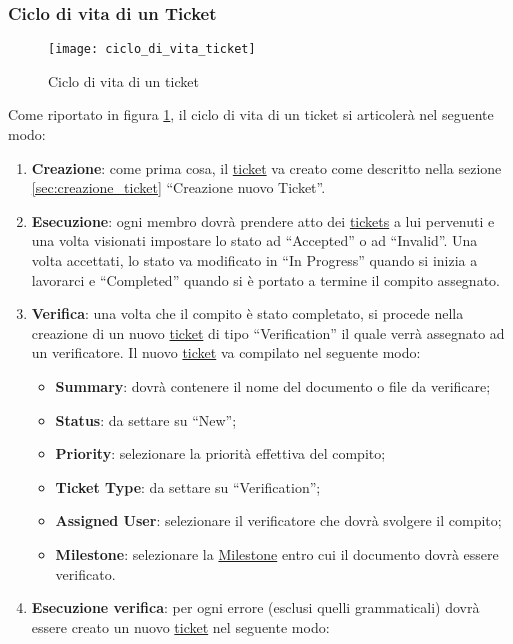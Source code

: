 \subsubsection{Ciclo di vita di un Ticket}
\label{sec:ciclo_vita_ticket}

\begin{figure}[h]
\centering
\texttt{[image: ciclo\_di\_vita\_ticket]}
\caption{Ciclo di vita di un ticket} \label{fig:ciclo_di_vita_ticket}
\end{figure}
Come riportato in figura \ref{fig:ciclo_di_vita_ticket}, il ciclo di vita di un ticket si articolerà nel seguente modo:
\begin{enumerate}
\item \textbf{Creazione}: come prima cosa, il \underline{ticket} va creato come descritto nella sezione \ref{sec:creazione_ticket} ``Creazione nuovo Ticket''.
\item \textbf{Esecuzione}: ogni membro dovrà prendere atto dei \underline{tickets} a lui pervenuti e una volta visionati impostare lo stato ad ``Accepted'' o ad ``Invalid''. Una volta accettati, lo stato va modificato in ``In Progress'' quando si inizia a lavorarci e ``Completed'' quando si è portato a termine il compito assegnato.
\item \textbf{Verifica}: una volta che il compito è stato completato, si procede nella creazione di un nuovo \underline{ticket} di tipo ``Verification'' il quale verrà assegnato ad un verificatore. Il nuovo \underline{ticket} va compilato nel seguente modo:
\begin{itemize}
\item \textbf{Summary}: dovrà contenere il nome del documento o file da verificare;
\item \textbf{Status}: da settare su ``New'';
\item \textbf{Priority}: selezionare la priorità effettiva del compito;
\item \textbf{Ticket Type}: da settare su ``Verification'';
\item \textbf{Assigned User}: selezionare il verificatore che dovrà svolgere il compito;
\item \textbf{Milestone}: selezionare la \underline{Milestone} entro cui il documento dovrà essere verificato.
\end{itemize}
\item \textbf{Esecuzione verifica}: per ogni errore (esclusi quelli grammaticali) dovrà essere creato un nuovo \underline{ticket} nel seguente modo:
\begin{itemize}

\end{itemize}
\end{enumerate}

